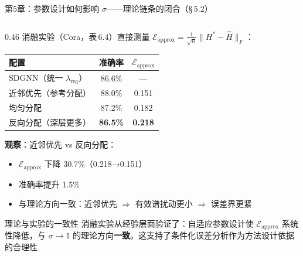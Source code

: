 \documentclass[aspectratio=169,9pt,xcolor=dvipsnames]{beamer}
\newcommand{\highlight}[1]{\textcolor{myred}{\textbf{#1}}}
\newcommand{\green}[1]{\textcolor{mygreen}{#1}}
\begin{document}
\begin{frame}{第5章：参数设计如何影响 $\sigma$——理论链条的闭合（§\,5.2）}
\begin{columns}[T]
\begin{column}{0.46\textwidth}
  消融实验（Cora，表\,6.4）直接测量 $\mathcal{E}_{\mathrm{approx}}=\frac{1}{\sqrt{n}}\|H^*-\hat{H}\|_F$：

  \vspace{0.05cm}
  \small
  \begin{tabular}{m{3.0cm}cc}
    \toprule
    配置 & 准确率 & $\mathcal{E}_{\mathrm{approx}}$ \\
    \midrule
    SDGNN（统一 $\lambda_{\mathrm{reg}}$） & 86.6\% & — \\
    近邻优先（参考分配） & \green{88.0\%} & \green{0.151} \\
    均匀分配 & 87.2\% & 0.182 \\
    反向分配（深层更多） & \highlight{86.5\%} & \highlight{0.218} \\
    \bottomrule
  \end{tabular}

  \vspace{0.15cm}
  \textbf{观察}：近邻优先 vs 反向分配：
  \begin{itemize}\small\setlength{\itemsep}{2pt}
    \item $\mathcal{E}_{\mathrm{approx}}$ 下降 30.7\%（0.218→0.151）
    \item 准确率提升 1.5\%
    \item 与理论方向一致：近邻优先 $\Rightarrow$ 有效谱扰动更小 $\Rightarrow$ 误差界更紧
  \end{itemize}

  \vspace{0.1cm}
  \begin{block}{理论与实验的一致性}
    消融实验从经验层面验证了：自适应参数设计使 $\mathcal{E}_{\mathrm{approx}}$ 系统性降低，与 $\sigma\to 1$ 的理论方向\textbf{一致}。这支持了条件化误差分析作为方法设计依据的合理性
  \end{block}
\end{column}
\end{columns}
\end{frame}
\end{document}
